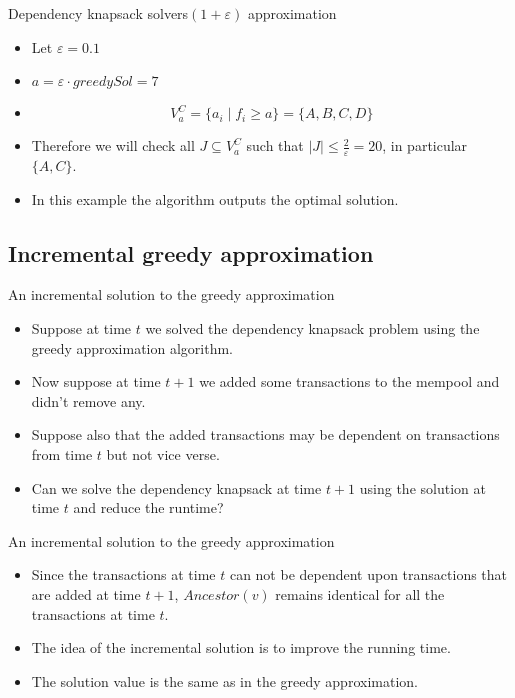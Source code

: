 \documentclass{beamer}
\begin{document}
\begin{frame}{Dependency knapsack solvers}{$(1+\varepsilon)$ approximation} 
    \begin{example}
        \begin{itemize}
            \item {Let $\varepsilon = 0.1$}
            \item {$ a = \varepsilon \cdot greedySol = 7$}
            \item {$$V_a^C = \{a_i \mid f_i \geq a \} = \{A,B,C,D\}$$}
            \item {Therefore we will check all $J \subseteq V_a^C$ such 
            that $|J| \leq \frac{2}{\varepsilon} = 20$, in particular 
            $\{A,C\}$.}
            \item {In this example the algorithm outputs the optimal 
            solution.}
        \end{itemize}
    \end{example}
\end{frame}

\subsection*{Incremental greedy approximation}

\begin{frame}{An incremental solution to the greedy approximation} %
    \begin{itemize}
        \item {Suppose at time $t$ we solved the dependency knapsack problem
         using the greedy approximation algorithm.}
        \item {Now suppose at time $t+1$ we added some transactions to the
         mempool and didn't remove any.}
        \item {Suppose also that the added transactions may be dependent on
         transactions from time $t$ but not vice verse.}
        \item {Can we solve the dependency knapsack at time $t+1$ using the
         solution at time $t$ and reduce the runtime?}
    \end{itemize}
\end{frame}

\begin{frame}{An incremental solution to the greedy approximation} %
    \begin{itemize}
        \item {Since the transactions at time $t$ can not be dependent upon 
        transactions that are added at time $t+1$, $Ancestor(v)$ remains 
        identical for all the transactions at time $t$.}
        \item {The idea of the incremental solution is to improve the running 
        time.}
        \item {The solution value is the same as in the greedy approximation.}
    \end{itemize}
\end{frame}
\end{document}
